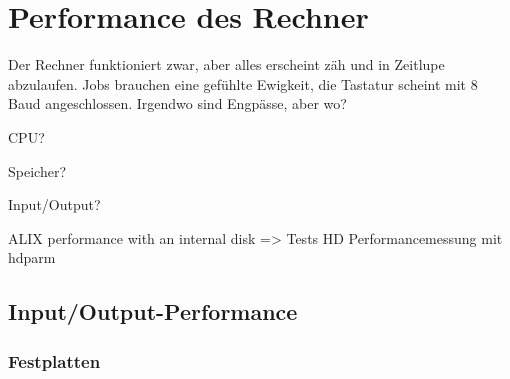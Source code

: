 \chapter{Performance des Rechner}
\label{cha:lokal-performance}

\begin{abstractsec}
  Der Rechner funktioniert zwar, aber alles erscheint zäh und in Zeitlupe
  abzulaufen. Jobs brauchen eine gefühlte Ewigkeit, die Tastatur scheint mit
  8 Baud angeschlossen. Irgendwo sind Engpässe, aber wo?
\end{abstractsec}

\begin{notes}
\item CPU?
\item Speicher?
\item Input/Output?
\item ALIX performance with an internal disk => Tests HD Performancemessung
  mit hdparm
\end{notes}

\section{Input/Output-Performance}
\label{sec:input-output-performance}


\subsection*{Festplatten}
\label{sec:performance-festplatten}

